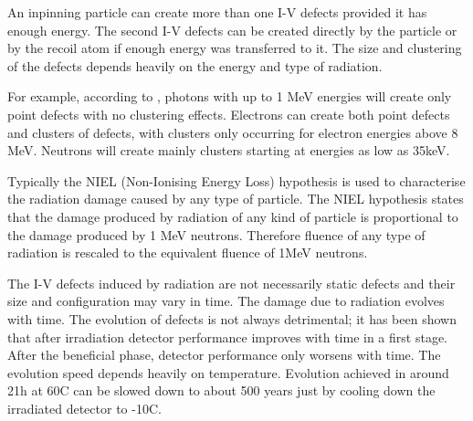 An inpinning particle can create more than one I-V defects provided it has enough energy. The second I-V defects can be created directly by the particle or by the recoil atom if enough energy was transferred to it. The size and clustering of the defects depends heavily on the energy and type of radiation. 


For example, according to \cite{MMoll}, photons with up to 1 MeV energies will create only point defects with no clustering effects. Electrons can create both point defects and clusters of defects, with clusters only occurring for electron energies above 8 MeV. Neutrons will create mainly clusters starting at energies as low as 35keV. 

Typically the NIEL (Non-Ionising Energy Loss) hypothesis is used to characterise the radiation damage caused by any type of particle. The NIEL hypothesis states that the damage produced by radiation of any kind of particle is proportional to the damage produced by 1 MeV neutrons. Therefore fluence of any type of radiation is rescaled to the equivalent fluence of 1MeV neutrons. %

The I-V defects induced by radiation are not necessarily static defects and their size and configuration may vary in time. The damage due to radiation evolves with time. The evolution of defects is not always detrimental; it has been shown that after irradiation detector performance improves with time in a first stage. After the beneficial phase, detector performance only worsens with time. The evolution speed depends heavily on temperature. Evolution achieved in around 21h at 60C can be slowed down to about 500 years just by cooling down the irradiated detector to -10C. 

